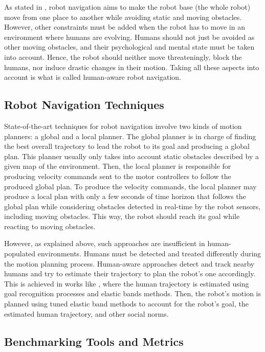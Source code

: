 As stated in \cite{thesisBuisan21}, robot navigation aims to make the robot base (the whole robot) move from one place to another while avoiding static and moving obstacles. However, other constraints must be added when the robot has to move in an environment where humans are evolving. 
Humans should not just be avoided as other moving obstacles, and their psychological and mental state must be taken into account. Hence, the robot should neither move threateningly, block the humans, nor induce drastic changes in their motion. Taking all these aspects into account is what is called human-aware robot navigation.

\subsection{Robot Navigation Techniques}

State-of-the-art techniques for robot navigation involve two kinds of motion planners: a global and a local planner. The global planner is in charge of finding the best overall trajectory to lead the robot to its goal and producing a global plan. This planner usually only takes into account static obstacles described by a given map of the environment. Then, the local planner is responsible for producing velocity commands sent to the motor controllers to follow the produced global plan. To produce the velocity commands, the local planner may produce a local plan with only a few seconds of time horizon that follows the global plan while considering obstacles detected in real-time by the robot sensors, including moving obstacles. This way, the robot should reach its goal while reacting to moving obstacles. 

However, as explained above, such approaches are insufficient in human-populated environments. Humans must be detected and treated differently during the motion planning process. Human-aware approaches detect and track nearby humans and try to estimate their trajectory to plan the robot's one accordingly. This is achieved in works like \cite{singamaneni2021human}, where the human trajectory is estimated using goal recognition processes and elastic bands methods. Then, the robot's motion is planned using tuned elastic band methods to account for the robot's goal, the estimated human trajectory, and other social norms.   

\subsection{Benchmarking Tools and Metrics}

